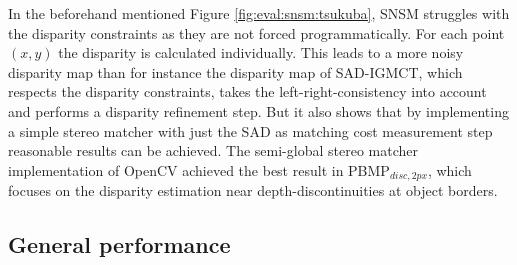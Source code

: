 \noindent In the beforehand mentioned Figure \ref{fig:eval:snsm:tsukuba}, SNSM struggles with the disparity constraints as they are not forced programmatically.
For each point $(x,y)$ the disparity is calculated individually.
This leads to a more noisy disparity map than for instance the disparity map of SAD-IGMCT, which respects the disparity constraints, takes the left-right-consistency into account and performs a disparity refinement step.
But it also shows that by implementing a simple stereo matcher with just the SAD as matching cost measurement step reasonable results can be achieved.
The semi-global stereo matcher implementation of OpenCV achieved the best result in PBMP$_{disc,2px}$, which focuses on the disparity estimation near depth-discontinuities at object borders.


\newpage
\subsection{General performance}




\begin{table}[h!]
\centering
{}
\caption[Result table for general performance]{Result table for general performance, focusing on PBMP$_{1px}$}
\end{table}

